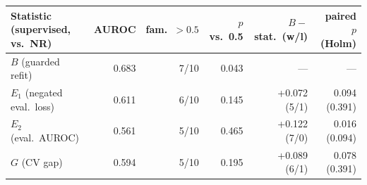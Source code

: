 \begin{tabular}{lrrrrr}\toprule
Statistic (supervised, vs.\ NR) & AUROC & fam.\ $>0.5$ & $p$ vs.\ 0.5 & $B-$stat.\ (w/l) & paired $p$ (Holm)\\\midrule
$B$ (guarded refit) & 0.683 & 7/10 & 0.043 & --- & ---\\
$E_1$ (negated eval.\ loss) & 0.611 & 6/10 & 0.145 & +0.072 (5/1) & 0.094 (0.391)\\
$E_2$ (eval.\ AUROC) & 0.561 & 5/10 & 0.465 & +0.122 (7/0) & 0.016 (0.094)\\
$G$ (CV gap) & 0.594 & 5/10 & 0.195 & +0.089 (6/1) & 0.078 (0.391)\\
\bottomrule\end{tabular}
